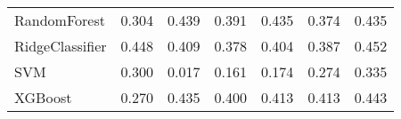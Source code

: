 \begin{tabular}{lllllll}
                   RandomForest & 0.304 &                     0.439 &                 0.391 &                  0.435 &                                   0.374 &     0.435 \\
                RidgeClassifier & 0.448 &                     0.409 &                 0.378 &                  0.404 &                                   0.387 &     0.452 \\
                            SVM & 0.300 &                     0.017 &                 0.161 &                  0.174 &                                   0.274 &     0.335 \\
                        XGBoost & 0.270 &                     0.435 &                 0.400 &                  0.413 &                                   0.413 &     0.443 \\
\bottomrule
\end{tabular}
